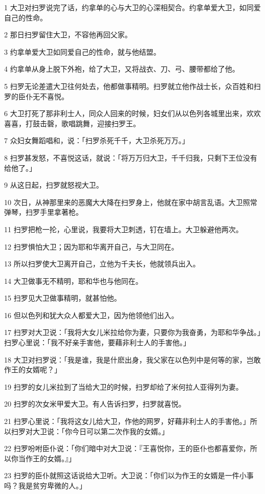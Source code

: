 \par 1 大卫对扫罗说完了话，约拿单的心与大卫的心深相契合。约拿单爱大卫，如同爱自己的性命。
\par 2 那日扫罗留住大卫，不容他再回父家。
\par 3 约拿单爱大卫如同爱自己的性命，就与他结盟。
\par 4 约拿单从身上脱下外袍，给了大卫，又将战衣、刀、弓、腰带都给了他。
\par 5 扫罗无论差遣大卫往何处去，他都做事精明。扫罗就立他作战士长，众百姓和扫罗的臣仆无不喜悦。
\par 6 大卫打死了那非利士人，同众人回来的时候，妇女们从以色列各城里出来，欢欢喜喜，打鼓击磬，歌唱跳舞，迎接扫罗王。
\par 7 众妇女舞蹈唱和，说：「扫罗杀死千千，大卫杀死万万。」
\par 8 扫罗甚发怒，不喜悦这话，就说：「将万万归大卫，千千归我，只剩下王位没有给他了。」
\par 9 从这日起，扫罗就怒视大卫。
\par 10 次日，从神那里来的恶魔大大降在扫罗身上，他就在家中胡言乱语。大卫照常弹琴，扫罗手里拿著枪。
\par 11 扫罗把枪一抡，心里说，我要将大卫刺透，钉在墙上。大卫躲避他两次。
\par 12 扫罗惧怕大卫；因为耶和华离开自己，与大卫同在。
\par 13 所以扫罗使大卫离开自己，立他为千夫长，他就领兵出入。
\par 14 大卫做事无不精明，耶和华也与他同在。
\par 15 扫罗见大卫做事精明，就甚怕他。
\par 16 但以色列和犹大众人都爱大卫，因为他领他们出入。
\par 17 扫罗对大卫说：「我将大女儿米拉给你为妻，只要你为我奋勇，为耶和华争战。」扫罗心里说：「我不好亲手害他，要藉非利士人的手害他。」
\par 18 大卫对扫罗说：「我是谁，我是什麽出身，我父家在以色列中是何等的家，岂敢作王的女婿呢？」
\par 19 扫罗的女儿米拉到了当给大卫的时候，扫罗却给了米何拉人亚得列为妻。
\par 20 扫罗的次女米甲爱大卫。有人告诉扫罗，扫罗就喜悦。
\par 21 扫罗心里说：「我将这女儿给大卫，作他的网罗，好藉非利士人的手害他。」所以扫罗对大卫说：「你今日可以第二次作我的女婿。」
\par 22 扫罗吩咐臣仆说：「你们暗中对大卫说：『王喜悦你，王的臣仆也都喜爱你，所以你当作王的女婿。』」
\par 23 扫罗的臣仆就照这话说给大卫听。大卫说：「你们以为作王的女婿是一件小事吗？我是贫穷卑微的人。」
